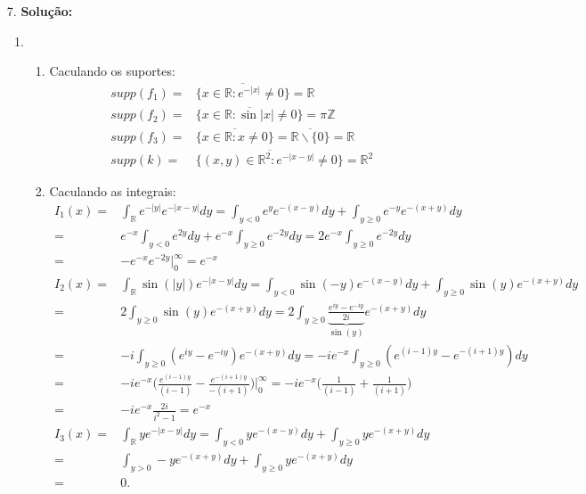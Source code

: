 \documentclass{article}
\begin{document}
\begin{enumerate}
		\item[7.] \textbf{Solução:} 
			\begin{enumerate}
				\item 
				\begin{enumerate}
					\item Caculando os suportes:
					$$
					\begin{aligned}
					supp(f_{1}) = & \overline{ \{x \in \mathbb{R}: e^{-|x|} \neq 0\} } = \mathbb{R} \\ 
					supp(f_{2}) = & \overline{ \{x \in \mathbb{R}: \sin{|x|} \neq 0\} } = \pi \mathbb{Z} \\ 
					supp(f_{3}) = & \overline{ \{x \in \mathbb{R}: x \neq 0\} } = \overline{ \mathbb{R}\backslash \{0\} } = \mathbb{R} \\
					supp(k) = & \overline{ \{(x,y) \in \mathbb{R}^{2}: e^{-|x-y|} \neq 0\} } = \mathbb{R}^{2}
					\end{aligned}
					$$
					
					\item Caculando as integrais:
					$$
					\begin{aligned}
						I_{1}(x) 
						= & \int_{\mathbb{R}}e^{-|y|}e^{-|x-y|} dy = \int_{y < 0 }e^{y}e^{-(x-y)} dy + \int_{y \geq 0 }e^{-y}e^{-(x+y)} dy \\
						= & e^{-x}\int_{y < 0 }e^{2y} dy + e^{-x}\int_{y \geq 0 }e^{-2y} dy = 2e^{-x}\int_{y \geq 0 }e^{-2y} dy \\
						= & -e^{-x}e^{-2y}\Big|^{\infty}_{0} = e^{-x} \\
						I_{2}(x) 
						= & \int_{\mathbb{R}}\sin(|y|)e^{-|x-y|} dy = \int_{y < 0 }\sin(-y)e^{-(x-y)} dy + \int_{y \geq 0 }\sin(y)e^{-(x+y)} dy \\
						= & 2 \int_{y \geq 0 }\sin(y)e^{-(x+y)} dy = 2 \int_{y \geq 0 } \underbrace{\frac{e^{iy} - e^{-iy}}{2i}}_{\sin(y)} e^{-(x+y)} dy \\
						= & -i\int_{y \geq 0 }(e^{iy} - e^{-iy})e^{-(x+y)} dy = -ie^{-x}\int_{y \geq 0 }(e^{(i-1)y} - e^{-(i+1)y})dy \\
						=  & -ie^{-x}\Big( \frac{e^{(i-1)y}}{(i-1)} - \frac{e^{-(i+1)y}}{-(i+1)} \Big) \Big|^{\infty}_{0} = -ie^{-x}\Big( \frac{1}{(i-1)} + \frac{1}{(i+1)} \Big) \\
						= & -ie^{-x} \frac{2i}{i^{2} - 1} = e^{-x} \\
						I_{3}(x)
						= & \int_{\mathbb{R}} y e^{-|x-y|} dy = \int_{y < 0 }ye^{-(x-y)} dy + \int_{y \geq 0 }ye^{-(x+y)} dy \\
						= & \int_{y > 0 }-ye^{-(x+y)} dy + \int_{y \geq 0 }ye^{-(x+y)} dy \\
						= & 0.
					\end{aligned}
					$$
				\end{enumerate}
			\end{enumerate}
	\end{enumerate}
		
\end{document}
